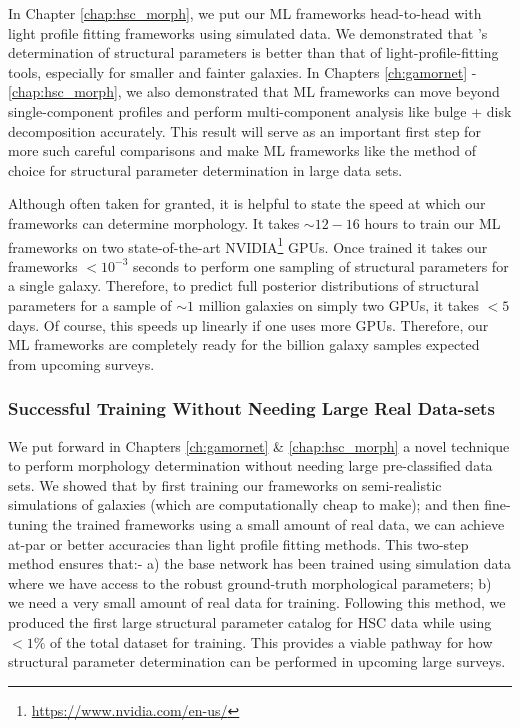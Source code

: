 In Chapter \ref{chap:hsc_morph}, we put our ML frameworks head-to-head with light profile fitting frameworks using simulated data. We demonstrated that \gampen{}'s determination of structural parameters is better than that of light-profile-fitting tools, especially for smaller and fainter galaxies. In Chapters \ref{ch:gamornet} - \ref{chap:hsc_morph}, we also demonstrated that ML frameworks can move beyond single-component \sersic{} profiles and perform multi-component analysis like bulge + disk decomposition accurately. This result will serve as an important first step for more such careful comparisons and make ML frameworks like \gampen{} the method of choice for structural parameter determination in large data sets.

 
Although often taken for granted, it is helpful to state the speed at which our frameworks can determine morphology. It takes $\sim12-16$ hours to train our ML frameworks on two state-of-the-art NVIDIA\footnote{\href{https://www.nvidia.com/en-us/}{https://www.nvidia.com/en-us/}} GPUs. Once trained it takes our frameworks $<10^{-3}$ seconds to perform one sampling of structural parameters for a single galaxy. Therefore, to predict full posterior distributions of structural parameters for a sample of $\sim1$ million galaxies on simply two GPUs, it takes $<5$ days. Of course, this speeds up linearly if one uses more GPUs. Therefore, our ML frameworks are completely ready for the billion galaxy samples expected from upcoming surveys.


\subsubsection{Successful Training Without Needing Large Real Data-sets}
We put forward in Chapters \ref{ch:gamornet} \& \ref{chap:hsc_morph} a novel technique to perform morphology determination without needing large pre-classified data sets. We showed that by first training our frameworks on semi-realistic simulations of galaxies (which are computationally cheap to make); and then fine-tuning the trained frameworks using a small amount of real data, we can achieve at-par or better accuracies than light profile fitting methods. This two-step method ensures that:- a) the base network has been trained using simulation data where we have access to the robust ground-truth morphological parameters; b) we need a very small amount of real data for training. Following this method, we produced the first large structural parameter catalog for HSC data while using $<1\%$ of the total dataset for training. This provides a viable pathway for how structural parameter determination can be performed in upcoming large surveys.  

